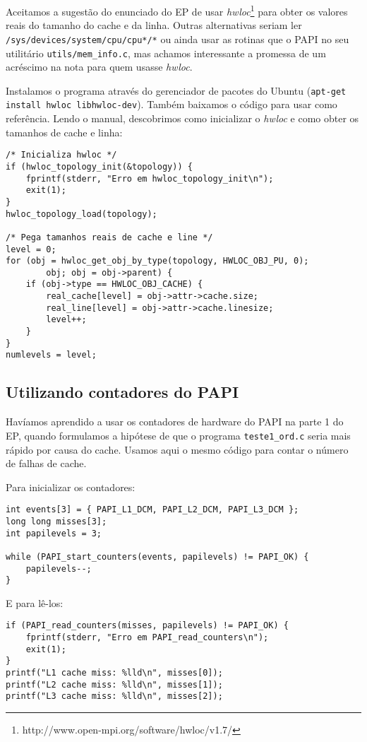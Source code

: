 \documentclass[a4paper,oneside,12pt]{article}
\begin{document}
Aceitamos a sugestão do enunciado do EP de usar \emph{hwloc}\footnote{http://www.open-mpi.org/software/hwloc/v1.7/} para obter os valores reais do tamanho do cache e da linha. Outras alternativas seriam ler {\tt /sys/devices/system/cpu/cpu*/*} ou ainda usar as rotinas que o PAPI no seu utilitário {\tt utils/mem\_info.c}, mas achamos interessante a promessa de um acréscimo na nota para quem usasse \emph{hwloc}.

Instalamos o programa através do gerenciador de pacotes do Ubuntu ({\tt apt-get install hwloc libhwloc-dev}). Também baixamos o código para usar como referência. Lendo o manual, descobrimos como inicializar o \emph{hwloc} e como obter os tamanhos de cache e linha:

\begin{verbatim}
/* Inicializa hwloc */
if (hwloc_topology_init(&topology)) {
    fprintf(stderr, "Erro em hwloc_topology_init\n");
    exit(1);
}
hwloc_topology_load(topology);

/* Pega tamanhos reais de cache e line */
level = 0;
for (obj = hwloc_get_obj_by_type(topology, HWLOC_OBJ_PU, 0);
        obj; obj = obj->parent) {
    if (obj->type == HWLOC_OBJ_CACHE) {
        real_cache[level] = obj->attr->cache.size;
        real_line[level] = obj->attr->cache.linesize;
        level++;
    }
}
numlevels = level;
\end{verbatim}

\subsection{Utilizando contadores do PAPI}

Havíamos aprendido a usar os contadores de hardware do PAPI na parte 1 do EP, quando formulamos a hipótese de que o programa {\tt teste1\_ord.c} seria mais rápido por causa do cache. Usamos aqui o mesmo código para contar o número de falhas de cache.

Para inicializar os contadores:

\begin{verbatim}
int events[3] = { PAPI_L1_DCM, PAPI_L2_DCM, PAPI_L3_DCM };
long long misses[3];
int papilevels = 3;

while (PAPI_start_counters(events, papilevels) != PAPI_OK) {
    papilevels--;
}
\end{verbatim}

E para lê-los:

\begin{verbatim}
if (PAPI_read_counters(misses, papilevels) != PAPI_OK) {
    fprintf(stderr, "Erro em PAPI_read_counters\n");
    exit(1);
}
printf("L1 cache miss: %lld\n", misses[0]);
printf("L2 cache miss: %lld\n", misses[1]);
printf("L3 cache miss: %lld\n", misses[2]);
\end{verbatim}
\end{document}
